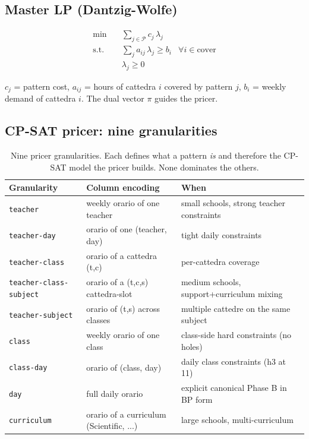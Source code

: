 \subsection{Master LP (Dantzig-Wolfe)}

\begin{align}
\min \quad & \sum_{j \in \mathcal{P}} c_j\, \lambda_j \\
\text{s.t.} \quad & \sum_j a_{ij}\, \lambda_j \ge b_i & \forall i \in \text{cover}\\
& \lambda_j \ge 0
\end{align}

$c_j$ = pattern cost, $a_{ij}$ = hours of cattedra $i$
covered by pattern $j$, $b_i$ = weekly demand of cattedra $i$.
The dual vector $\pi$ guides the pricer.

\subsection{CP-SAT pricer: nine granularities}

\begin{table}[h]
\centering
\sffamily\small
\begin{tabular}{p{3.4cm}p{4.0cm}p{4.0cm}}
\toprule
Granularity & Column encoding & When \\
\midrule
\texttt{teacher}                & weekly orario of one teacher                & small schools, strong teacher constraints \\
\texttt{teacher-day}            & orario of one (teacher, day)                & tight daily constraints \\
\texttt{teacher-class}          & orario of a cattedra (t,c)                  & per-cattedra coverage \\
\texttt{teacher-class-subject}  & orario of a (t,c,s) cattedra-slot           & medium schools, support+curriculum mixing \\
\texttt{teacher-subject}        & orario of (t,s) across classes              & multiple cattedre on the same subject \\
\texttt{class}                  & weekly orario of one class                  & class-side hard constraints (no holes) \\
\texttt{class-day}              & orario of (class, day)                      & daily class constraints (h3 at 11) \\
\texttt{day}                    & full daily orario                           & explicit canonical Phase B in BP form \\
\texttt{curriculum}             & orario of a curriculum (Scientific, ...)    & large schools, multi-curriculum \\
\bottomrule
\end{tabular}
\caption{Nine pricer granularities. Each defines what a pattern
\emph{is} and therefore the CP-SAT model the pricer builds.
None dominates the others.}
\label{tab:bp-granularity-en}
\end{table}

